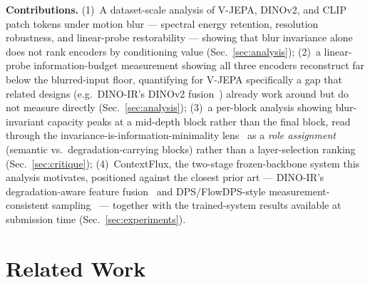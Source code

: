 \documentclass{article}
\begin{document}
\noindent\textbf{Contributions.} (1)~A dataset-scale analysis of V-JEPA, DINOv2, and CLIP patch tokens under motion blur — spectral energy retention, resolution robustness, and linear-probe restorability — showing that blur invariance alone does not rank encoders by conditioning value (Sec.~\ref{sec:analysis}); (2)~a linear-probe information-budget measurement showing all three encoders reconstruct far below the blurred-input floor, quantifying for V-JEPA specifically a gap that related designs (e.g.\ DINO-IR's DINOv2 fusion~\cite{dinoir2024}) already work around but do not measure directly (Sec.~\ref{sec:analysis}); (3)~a per-block analysis showing blur-invariant capacity peaks at a mid-depth block rather than the final block, read through the invariance-is-information-minimality lens~\cite{achille2018invariance} as a \emph{role assignment} (semantic vs.\ degradation-carrying blocks) rather than a layer-selection ranking (Sec.~\ref{sec:critique}); (4)~ContextFlux, the two-stage frozen-backbone system this analysis motivates, positioned against the closest prior art — DINO-IR's degradation-aware feature fusion~\cite{dinoir2024} and DPS/FlowDPS-style measurement-consistent sampling~\cite{chung2023diffusion,flowdps2025} — together with the trained-system results available at submission time (Sec.~\ref{sec:experiments}).

\section{Related Work}
\label{sec:related}
\end{document}
